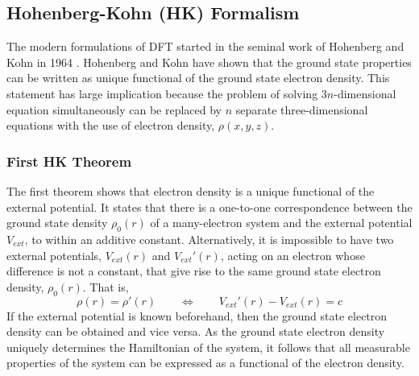
\subsection{Hohenberg-Kohn (HK) Formalism}
The modern formulations of DFT started in the seminal work of Hohenberg and Kohn in 1964 \citep{Hohenberg1964}. Hohenberg and Kohn have shown that the ground state properties can be written as unique functional of the ground state electron density. This statement has large implication because the problem of solving 3$n$-dimensional equation simultaneously can be replaced by $n$ separate three-dimensional equations with the use of electron density, $\rho(x,y,z)$.
\subsubsection{First HK Theorem}
The first theorem shows that electron density is a unique functional of the external potential. It states that there is a one-to-one correspondence between the ground state density $\rho_0(r)$ of a many-electron system and the external potential $V_{ext}$, to within an additive constant. Alternatively, it is impossible to have two external potentials, $V_{ext}(r)$ and $V_{ext}'(r)$, acting on an electron whose difference is not a constant, that give rise to the same ground    state electron density, $\rho_0(r)$. That is,
\begin{equation}
	\rho(r) = \rho'(r) \quad \quad \Longleftrightarrow \quad \quad V_{ext}'(r) - V_{ext}(r) = c
\end{equation}
If the external potential is known beforehand, then the ground state electron density can be obtained and vice versa. As the ground state electron density uniquely determines the Hamiltonian of the system, it follows that all measurable properties of the system can be expressed as a functional of the electron density.
